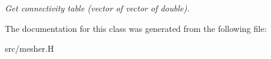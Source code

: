 \begin{DoxyCompactItemize}
\begin{DoxyCompactList}\small\item\em Get connectivity table (vector of vector of double). \item\end{DoxyCompactList}\end{DoxyCompactItemize}


The documentation for this class was generated from the following file:\begin{DoxyCompactItemize}
\item 
src/mesher.H\end{DoxyCompactItemize}
